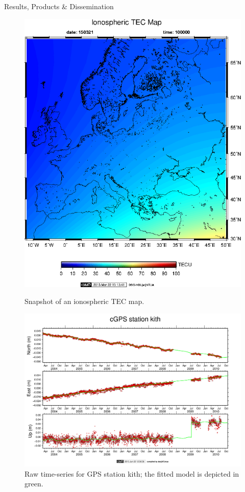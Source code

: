 \documentclass[final,a0,portrait]{beamer}
\newlength{\onecolwid}
\begin{document}
\begin{frame}[t]
\begin{columns}[t]
\begin{column}{\onecolwid}
\begin{block}{Results, Products \& Dissemination}
{\begin{figure}
\centering
\begin{minipage}{.5\textwidth}
    \centering
    \includegraphics[width=.85\linewidth]{koko-5.eps}
    \caption{Snapshot of an ionospheric TEC map.} %
    \label{fig:ion}
\end{minipage}%
\begin{minipage}{.5\textwidth}
    \centering
    \includegraphics[width=1.15\linewidth]{kith-mod.png}
    \caption{Raw time-series for GPS station kith; the fitted model is depicted in green.}
    \label{fig:modts}
\end{minipage}
\end{figure}

}
\end{block}
\end{column}
\end{columns}
\end{frame}
\end{document}
